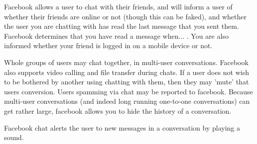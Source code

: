 Facebook allows a user to chat with their friends, and will inform a user of
whether their friends are online or not (though this can be faked), and whether
the user you are chatting with has read the last message that you sent them.
Facebook determines that you have read a message when... . You are also informed whether your friend is logged in on a mobile
device or not.

Whole groups of users may chat together, in multi-user conversations. Facebook
also supports video calling and file transfer during chats. If a user does not
wish to be bothered by another using chatting with them, then they may 'mute'
that users conversion. Users spamming via chat may be reported to facebook.
Because multi-user conversations (and indeed long running one-to-one
conversations) can get rather large, facebook allows you to hide the history of
a conversation.

Facebook chat alerts the user to new messages in a conversation by playing a
sound.
